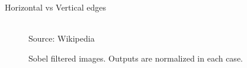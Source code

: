\begin{frame}{Horizontal vs Vertical edges}
    \begin{figure}
        \centering
          \tiny{\\ Source: Wikipedia}
         \caption{\footnotesize{Sobel filtered images. Outputs are normalized in each case. }}
    \end{figure}
\end{frame}

